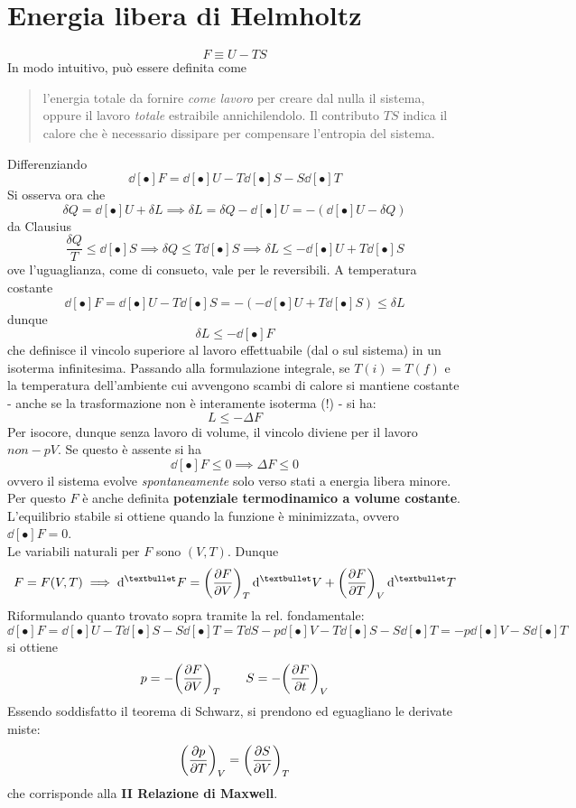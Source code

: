 \documentclass[10pt, oneside]{book}
\begin{document}
\section{Energia libera di Helmholtz}
\[F \equiv U - TS\]
In modo intuitivo, può essere definita come
\begin{quote}
l'energia totale da fornire \textit{come lavoro} per creare dal nulla il sistema, oppure il lavoro \textit{totale} estraibile annichilendolo. Il contributo $TS$ indica il calore che è necessario dissipare per compensare l'entropia del sistema.
\end{quote}
Differenziando
\[\dd[•]{F} = \dd[•]{U} - T\dd[•]{S} - S\dd[•]{T}\]
Si osserva ora che
\[\delta Q = \dd[•]{U} + \delta L \implies \delta L = \delta Q - \dd[•]{U} = - (\dd[•]{U} - \delta Q)\]
da Clausius
\[\frac{\delta Q}{T} \leq \dd[•]{S} \implies \delta Q \leq T \dd[•]{S} \implies \delta L \leq - \dd[•]{U} + T \dd[•]{S}\]
ove l'uguaglianza, come di consueto, vale per le reversibili. A temperatura costante
\[\dd[•]{F} = \dd[•]{U} - T\dd[•]{S} = - (- \dd[•]{U} + T \dd[•]{S}) \leq \delta L\]
dunque
\[\delta L \leq - \dd[•]{F}\]
che definisce il vincolo superiore al lavoro effettuabile (dal o sul sistema) in un isoterma infinitesima. Passando alla formulazione integrale, se $T(i) = T(f)$ e la temperatura dell'ambiente cui avvengono scambi di calore si mantiene costante - anche se la trasformazione non è interamente isoterma (!) - si ha:
\[L \leq - \Delta F\]
Per isocore, dunque senza lavoro di volume,  il vincolo diviene per il lavoro $non-pV$. Se questo è assente si ha
\[\dd[•]{F} \leq 0 \implies \Delta F \leq 0\] 
ovvero il sistema evolve \textit{spontaneamente} solo verso stati a energia libera minore. Per questo $F$ è anche definita \textbf{potenziale termodinamico a volume costante}.\\
L'equilibrio stabile si ottiene quando la funzione è minimizzata, ovvero $\dd[•]{F} = 0$.\\Le variabili naturali per $F$ sono $(V,T)$. Dunque
\[F = F(V,T) \implies \dd[•]{F} = \bigg(\pdv{F}{V}\bigg)_T \dd[•]{V} + \bigg(\pdv{F}{T}\bigg)_V \dd[•]{T}\]
Riformulando quanto trovato sopra tramite la rel. fondamentale:
\[\dd[•]{F} = \dd[•]{U} - T \dd[•]{S} -S \dd[•]{T}= T \dd{S} - p \dd[•]{V}  - T \dd[•]{S} - S \dd[•]{T}= -p \dd[•]{V} - S \dd[•]{T}\]
si ottiene
\[p = - \bigg(\pdv{F}{V}\bigg)_T \qquad S = - \bigg(\pdv{F}{t}\bigg)_V\]
Essendo soddisfatto il teorema di Schwarz, si prendono ed eguagliano le derivate miste:
\[\bigg(\pdv{p}{T}\bigg)_V = \bigg(\pdv{S}{V}\bigg)_T\]
che corrisponde alla \textbf{II Relazione di Maxwell}.\\
\end{document}
